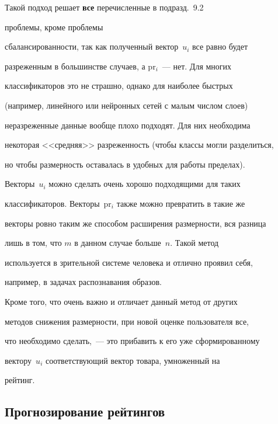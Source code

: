 Такой подход решает \textbf{все} перечисленные в подразд.~9.2


проблемы, кроме проблемы


сбалансированности, так как полученный вектор~$u_i$ все равно будет


разреженным в большинстве случаев, а pr$_i$~--- нет. Для многих


классификаторов это не страшно, однако для наиболее быстрых


(например, линейного или нейронных сетей с малым числом слоев)


неразреженные данные вообще плохо подходят. Для них необходима


некоторая <<средняя>> разреженность (чтобы классы могли разделиться,


но чтобы размерность оставалась в удобных для работы пределах).


Векторы~$u_i$ можно сделать очень хорошо подходящими для таких


классификаторов. Векторы~pr$_i$ также можно превратить в такие же


векторы ровно таким же способом расширения размерности, вся разница


лишь в том, что $m$ в данном случае больше~$n.$ Такой метод


используется в зрительной системе человека и отлично проявил себя,


например, в задачах распознавания образов.


{





}





Кроме того, что очень важно и отличает данный метод от других


методов снижения размерности, при новой оценке пользователя все,


что необходимо сделать,~--- это прибавить к его уже сформированному


вектору~$u_i$ соответствующий вектор товара, умноженный на


рейтинг.





\subsection{Прогнозирование рейтингов}





